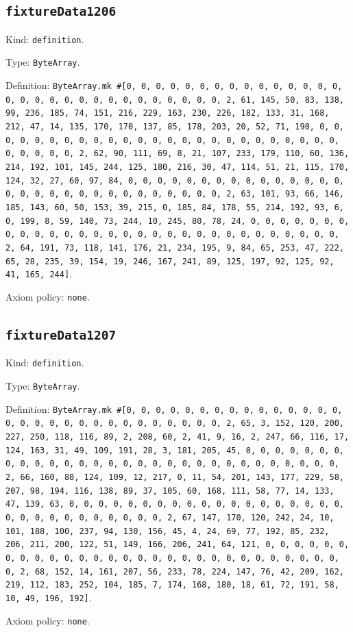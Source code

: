 \documentclass[11pt]{article}
\begin{document}
\subsection*{\texttt{fixtureData1206}}
\noindent Kind: \texttt{definition}.\par
\noindent Type: \texttt{ByteArray}.\par
\noindent Definition: \texttt{ByteArray.mk \#[0, 0, 0, 0, 0, 0, 0, 0, 0, 0, 0, 0, 0, 0, 0, 0, 0, 0, 0, 0, 0, 0, 0, 0, 0, 0, 0, 0, 0, 0, 2, 61, 145, 50, 83, 138, 99, 236, 185, 74, 151, 216, 229, 163, 230, 226, 182, 133, 31, 168, 212, 47, 14, 135, 170, 170, 137, 85, 178, 203, 20, 52, 71, 190, 0, 0, 0, 0, 0, 0, 0, 0, 0, 0, 0, 0, 0, 0, 0, 0, 0, 0, 0, 0, 0, 0, 0, 0, 0, 0, 0, 0, 0, 0, 2, 62, 90, 111, 69, 8, 21, 107, 233, 179, 110, 60, 136, 214, 192, 101, 145, 244, 125, 180, 216, 30, 47, 114, 51, 21, 115, 170, 124, 32, 27, 60, 97, 84, 0, 0, 0, 0, 0, 0, 0, 0, 0, 0, 0, 0, 0, 0, 0, 0, 0, 0, 0, 0, 0, 0, 0, 0, 0, 0, 0, 0, 0, 0, 2, 63, 101, 93, 66, 146, 185, 143, 60, 50, 153, 39, 215, 0, 185, 84, 178, 55, 214, 192, 93, 6, 0, 199, 8, 59, 140, 73, 244, 10, 245, 80, 78, 24, 0, 0, 0, 0, 0, 0, 0, 0, 0, 0, 0, 0, 0, 0, 0, 0, 0, 0, 0, 0, 0, 0, 0, 0, 0, 0, 0, 0, 0, 0, 2, 64, 191, 73, 118, 141, 176, 21, 234, 195, 9, 84, 65, 253, 47, 222, 65, 28, 235, 39, 154, 19, 246, 167, 241, 89, 125, 197, 92, 125, 92, 41, 165, 244]}.\par
\noindent Axiom policy: \texttt{none}.\par
\subsection*{\texttt{fixtureData1207}}
\noindent Kind: \texttt{definition}.\par
\noindent Type: \texttt{ByteArray}.\par
\noindent Definition: \texttt{ByteArray.mk \#[0, 0, 0, 0, 0, 0, 0, 0, 0, 0, 0, 0, 0, 0, 0, 0, 0, 0, 0, 0, 0, 0, 0, 0, 0, 0, 0, 0, 0, 0, 2, 65, 3, 152, 120, 200, 227, 250, 118, 116, 89, 2, 208, 60, 2, 41, 9, 16, 2, 247, 66, 116, 17, 124, 163, 31, 49, 109, 191, 28, 3, 181, 205, 45, 0, 0, 0, 0, 0, 0, 0, 0, 0, 0, 0, 0, 0, 0, 0, 0, 0, 0, 0, 0, 0, 0, 0, 0, 0, 0, 0, 0, 0, 0, 2, 66, 160, 88, 124, 109, 12, 217, 0, 11, 54, 201, 143, 177, 229, 58, 207, 98, 194, 116, 138, 89, 37, 105, 60, 168, 111, 58, 77, 14, 133, 47, 139, 63, 0, 0, 0, 0, 0, 0, 0, 0, 0, 0, 0, 0, 0, 0, 0, 0, 0, 0, 0, 0, 0, 0, 0, 0, 0, 0, 0, 0, 0, 0, 2, 67, 147, 170, 120, 242, 24, 10, 101, 188, 100, 237, 94, 130, 156, 45, 4, 24, 69, 77, 192, 85, 232, 206, 211, 200, 122, 51, 149, 166, 206, 241, 64, 121, 0, 0, 0, 0, 0, 0, 0, 0, 0, 0, 0, 0, 0, 0, 0, 0, 0, 0, 0, 0, 0, 0, 0, 0, 0, 0, 0, 0, 0, 0, 2, 68, 152, 14, 161, 207, 56, 233, 78, 224, 147, 76, 42, 209, 162, 219, 112, 183, 252, 104, 185, 7, 174, 168, 180, 18, 61, 72, 191, 58, 10, 49, 196, 192]}.\par
\noindent Axiom policy: \texttt{none}.\par
\end{document}
